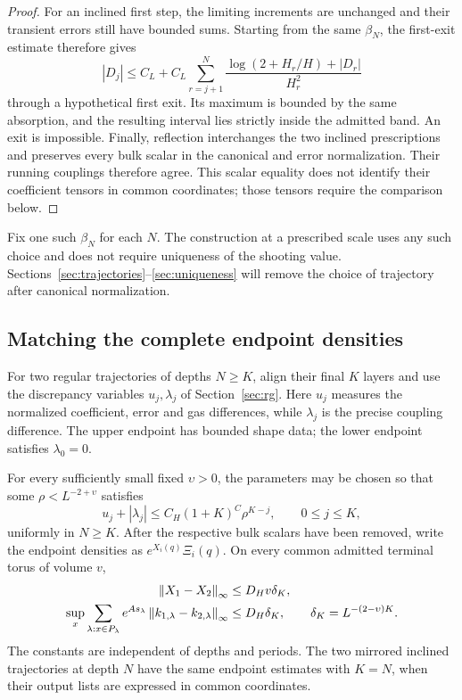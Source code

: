\begin{proof}
For an inclined first step, the limiting increments are unchanged
and their transient errors still have bounded sums. Starting from
the same $\beta_N$, the first-exit estimate
 therefore gives
\[
 |D_j|\le C_L+C_L\sum_{r=j+1}^N
 \frac{\log(2+H_r/H)+|D_r|}{H_r^2}
\]
through a hypothetical first exit. Its maximum is bounded by the
same absorption, and the resulting interval lies strictly inside the
admitted band. An exit is impossible. Finally, reflection interchanges
the two inclined prescriptions and preserves every bulk scalar in the
canonical and error normalization. Their running couplings therefore
agree. This scalar equality does not identify their coefficient tensors
in common coordinates; those tensors require the comparison below.
\end{proof}

Fix one such $\beta_N$ for each $N$.  The construction at a prescribed
scale uses any such choice and does not require uniqueness of the shooting
value.  Sections~\ref{sec:trajectories}--\ref{sec:uniqueness} will remove
the choice of trajectory after canonical normalization.

\subsection{Matching the complete endpoint densities}

For two regular trajectories of depths $N\ge K$, align their final
$K$ layers and use the discrepancy variables $u_j,\lambda_j$ of
Section~\ref{sec:rg}. Here $u_j$ measures the normalized coefficient,
error and gas differences, while $\lambda_j$ is the precise coupling
difference. The upper endpoint has bounded shape data; the lower
endpoint satisfies $\lambda_0=0$.

\begin{proposition}
\label{prop:endpoint-matching}
For every sufficiently small fixed $\upsilon>0$, the parameters may be
chosen so that some $\rho<L^{-2+\upsilon}$ satisfies
\begin{equation}
 u_j+|\lambda_j|
 \le C_H(1+K)^C\rho^{K-j},
 \qquad 0\le j\le K,
 \label{eq:orig-14}
\end{equation}
uniformly in $N\ge K$. After the respective bulk scalars have been
removed, write the endpoint densities as $e^{X_i(q)}\Xi_i(q)$.
On every common admitted terminal torus of volume $v$,
\begin{align}
 \left\lVert X_1-X_2\right\rVert_\infty&\le D_Hv\delta_K,\nonumber\\
 \sup_x\sum_{\lambda:x\in P_\lambda}
 e^{As_\lambda}\left\lVert k_{1,\lambda}-k_{2,\lambda}\right\rVert_\infty
 &\le D_H\delta_K,
 \qquad \delta_K=L^{-(2-\upsilon)K}.
 \label{eq:orig-15}
\end{align}
The constants are independent of depths and periods. The two mirrored
inclined trajectories at depth $N$ have the same endpoint estimates
with $K=N$, when their output lists are expressed in common coordinates.
\end{proposition}

